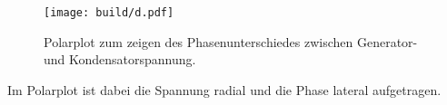\begin{figure}
    \centering
    \caption{Polarplot zum zeigen des Phasenunterschiedes zwischen Generator- und Kondensatorspannung.}
    \texttt{[image: build/d.pdf]}
    \label{fig:d}
\end{figure}

Im Polarplot ist dabei die Spannung radial und die Phase lateral aufgetragen. 


\FloatBarrier
%
